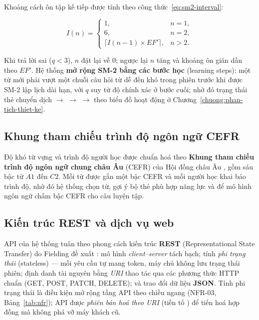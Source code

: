 Khoảng cách ôn tập kế tiếp được tính theo công thức~\eqref{eq:sm2-interval}:

\begin{equation}
  \label{eq:sm2-interval}
  I(n) =
  \begin{cases}
    1, & n = 1,\\[2pt]
    6, & n = 2,\\[2pt]
    \big\lceil I(n-1)\times EF' \big\rceil, & n > 2 .
  \end{cases}
\end{equation}

Khi trả lời sai (\( q < 3 \)), \( n \) đặt lại về 0; ngược lại \( n \) tăng
và khoảng ôn giãn dần theo \( EF' \). Hệ thống \textbf{mở rộng SM-2 bằng các
bước học} (learning steps): một từ mới phải vượt một chuỗi câu hỏi từ dễ đến
khó trong phiên trước khi được SM-2 lập lịch dài hạn, với \( q \) suy từ độ
chính xác ở bước cuối; nhờ đó trạng thái thẻ chuyển dịch  \( \to \)
 \( \to \)  \( \to \)  theo biểu
đồ hoạt động ở Chương~\ref{chuong:phan-tich-thiet-ke}.

\subsection{Khung tham chiếu trình độ ngôn ngữ CEFR}
\label{subsec:cefr-theory}

Độ khó từ vựng và trình độ người học được chuẩn hoá theo \textbf{Khung tham
chiếu trình độ ngôn ngữ chung châu Âu} (CEFR) của Hội đồng châu Âu
\cite{coe2001cefr}, gồm sáu bậc từ \( A1 \) đến \( C2 \). Mỗi từ được gắn
một bậc CEFR và mỗi người học khai báo trình độ, nhờ đó hệ thống chọn từ,
gợi ý bộ thẻ phù hợp năng lực và để mô hình ngôn ngữ chấm bậc CEFR cho câu
luyện tập.

\subsection{Kiến trúc REST và dịch vụ web}
\label{subsec:rest-theory}

API của hệ thống tuân theo phong cách kiến trúc \textbf{REST}
(Representational State Transfer) do Fielding đề xuất \cite{fielding2000rest}:
mô hình \textit{client--server} tách bạch; tính \textit{phi trạng thái}
(stateless) --- mỗi yêu cầu tự mang token, máy chủ không lưu trạng thái
phiên; định danh tài nguyên bằng \textit{URI} thao tác qua các phương thức
HTTP chuẩn (GET, POST, PATCH, DELETE); và trao đổi dữ liệu \textbf{JSON}.
Tính phi trạng thái là điều kiện mở rộng tầng API theo chiều ngang (NFR-03,
Bảng~\ref{tab:nfr}); API được \textit{phiên bản hoá theo URI} (tiền tố
) để tiến hoá hợp đồng mà không phá vỡ máy khách cũ.


